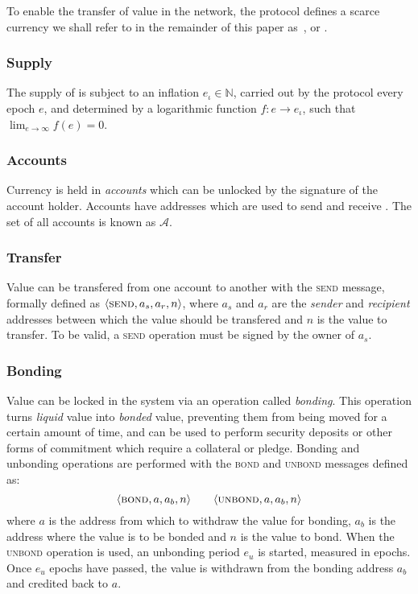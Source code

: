 To enable the transfer of value in the network, the protocol defines a scarce
currency we shall refer to in the remainder of this paper as~\coin{}, or
\oscoin{}.

\subsubsection{Supply}

The supply of \coin{} is subject to an inflation $e_{\iota} \in \mathbb{N}$,
carried out by the protocol every epoch $e$, and determined by a logarithmic
function $f : e \to e_{\iota}$, such that $\lim_{e \to \infty} f(e) = 0$.

\subsubsection{Accounts}
\label{accounts}

Currency is held in \emph{accounts} which can be unlocked by the signature of
the account holder. Accounts have addresses which are used to send and receive
\coin{}. The set of all accounts is known as $\mathcal{A}$.

\subsubsection{Transfer}

Value can be transfered from one account to another with the \textsc{send}
message, formally defined as $\langle \text{\normalfont\scshape send}, a_{s}, a_{r}, n \rangle$, where $a_{s}$ and
$a_{r}$ are the \emph{sender} and \emph{recipient} addresses between which the
value should be transfered and $n$ is the value to transfer.  To be valid, a
\textsc{send} operation must be signed by the owner of $a_{s}$.

\subsubsection{Bonding}

Value can be locked in the system via an operation called \emph{bonding}.
This operation turns \emph{liquid} value into \emph{bonded} value, preventing
them from being moved for a certain amount of time, and can be used to perform
security deposits or other forms of commitment which require a collateral or
pledge. Bonding and unbonding operations are performed with the
\textsc{bond} and \textsc{unbond} messages defined as:
\[
    \tx{bond}{a, a_b, n} \qquad \tx{unbond}{a, a_b, n}
    \medskip
\]
where $a$ is the address from which to withdraw the value for bonding, $a_b$ is
the address where the value is to be bonded and $n$ is the value to bond. When
the \textsc{unbond} operation is used, an unbonding period $e_u$ is started,
measured in epochs. Once $e_{u}$ epochs have passed, the value is withdrawn
from the bonding address $a_b$ and credited back to $a$.

